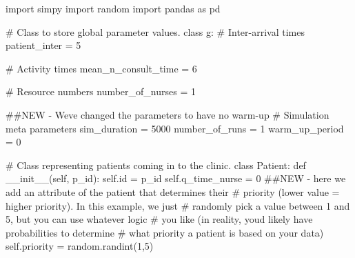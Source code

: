 \documentclass[
  letterpaper,
  DIV=11,
  numbers=noendperiod]{scrreprt}
\newenvironment{Shaded}{\begin{snugshade}}{\end{snugshade}}
\newcommand{\BuiltInTok}[1]{\textcolor[rgb]{0.00,0.23,0.31}{#1}}
\newcommand{\CommentTok}[1]{\textcolor[rgb]{0.37,0.37,0.37}{#1}}
\newcommand{\DecValTok}[1]{\textcolor[rgb]{0.68,0.00,0.00}{#1}}
\newcommand{\FunctionTok}[1]{\textcolor[rgb]{0.28,0.35,0.67}{#1}}
\newcommand{\ImportTok}[1]{\textcolor[rgb]{0.00,0.46,0.62}{#1}}
\newcommand{\KeywordTok}[1]{\textcolor[rgb]{0.00,0.23,0.31}{#1}}
\newcommand{\NormalTok}[1]{\textcolor[rgb]{0.00,0.23,0.31}{#1}}
\newcommand{\OperatorTok}[1]{\textcolor[rgb]{0.37,0.37,0.37}{#1}}
\newcommand{\VariableTok}[1]{\textcolor[rgb]{0.07,0.07,0.07}{#1}}
\begin{document}
\begin{tcolorbox}[enhanced jigsaw, rightrule=.15mm, colback=white, colframe=quarto-callout-note-color-frame, colbacktitle=quarto-callout-note-color!10!white, toprule=.15mm, coltitle=black, opacityback=0, titlerule=0mm, bottomtitle=1mm, breakable, title=\textcolor{quarto-callout-note-color}{\faInfo}\hspace{0.5em}{Note}, opacitybacktitle=0.6, toptitle=1mm, arc=.35mm, bottomrule=.15mm, leftrule=.75mm, left=2mm]

\begin{Shaded}
\begin{Highlighting}[]
\ImportTok{import}\NormalTok{ simpy}
\ImportTok{import}\NormalTok{ random}
\ImportTok{import}\NormalTok{ pandas }\ImportTok{as}\NormalTok{ pd}

\CommentTok{\# Class to store global parameter values.}
\KeywordTok{class}\NormalTok{ g:}
    \CommentTok{\# Inter{-}arrival times}
\NormalTok{    patient\_inter }\OperatorTok{=} \DecValTok{5}

    \CommentTok{\# Activity times}
\NormalTok{    mean\_n\_consult\_time }\OperatorTok{=} \DecValTok{6}

    \CommentTok{\# Resource numbers}
\NormalTok{    number\_of\_nurses }\OperatorTok{=} \DecValTok{1}

    \CommentTok{\#\#NEW {-} We\textquotesingle{}ve changed the parameters to have no warm{-}up}
    \CommentTok{\# Simulation meta parameters}
\NormalTok{    sim\_duration }\OperatorTok{=} \DecValTok{5000}
\NormalTok{    number\_of\_runs }\OperatorTok{=} \DecValTok{1}
\NormalTok{    warm\_up\_period }\OperatorTok{=} \DecValTok{0}

\CommentTok{\# Class representing patients coming in to the clinic.}
\KeywordTok{class}\NormalTok{ Patient:}
    \KeywordTok{def} \FunctionTok{\_\_init\_\_}\NormalTok{(}\VariableTok{self}\NormalTok{, p\_id):}
        \VariableTok{self}\NormalTok{.}\BuiltInTok{id} \OperatorTok{=}\NormalTok{ p\_id}
        \VariableTok{self}\NormalTok{.q\_time\_nurse }\OperatorTok{=} \DecValTok{0}
        \CommentTok{\#\#NEW {-} here we add an attribute of the patient that determines their}
        \CommentTok{\# priority (lower value = higher priority).  In this example, we just}
        \CommentTok{\# randomly pick a value between 1 and 5, but you can use whatever logic}
        \CommentTok{\# you like (in reality, you\textquotesingle{}d likely have probabilities to determine}
        \CommentTok{\# what priority a patient is based on your data)}
        \VariableTok{self}\NormalTok{.priority }\OperatorTok{=}\NormalTok{ random.randint(}\DecValTok{1}\NormalTok{,}\DecValTok{5}\NormalTok{)}


\end{Highlighting}
\end{Shaded}
\end{tcolorbox}
\end{document}
